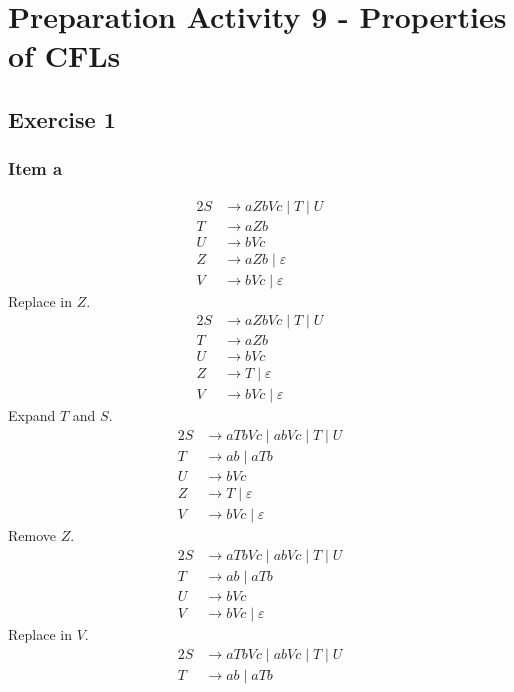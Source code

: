 \setcounter{section}{8}
\section{Preparation Activity 9 - Properties of CFLs}
{
\renewcommand{\thesubsubsection}{\thesubsection\alph{subsubsection}}
\subsection{Exercise 1}
\subsubsection{Item a}
\begin{alignat*}{2}
	S &\rightarrow aZbVc\mid T\mid U\\
	T &\rightarrow aZb\\
	U &\rightarrow bVc\\
	Z &\rightarrow aZb\mid \varepsilon \\
	V &\rightarrow bVc\mid \varepsilon
\end{alignat*}
Replace in $Z$.
\begin{alignat*}{2}
	S &\rightarrow aZbVc\mid T\mid U\\
	T &\rightarrow aZb\\
	U &\rightarrow bVc\\
	Z &\rightarrow T\mid \varepsilon \\
	V &\rightarrow bVc\mid \varepsilon
\end{alignat*}
Expand $T$ and $S$.
\begin{alignat*}{2}
	S &\rightarrow aTbVc\mid abVc\mid T\mid U\\
	T &\rightarrow ab\mid aTb\\
	U &\rightarrow bVc\\
	Z &\rightarrow T\mid \varepsilon \\
	V &\rightarrow bVc\mid \varepsilon
\end{alignat*}
Remove $Z$.
\begin{alignat*}{2}
	S &\rightarrow aTbVc\mid abVc\mid T\mid U\\
	T &\rightarrow ab\mid aTb\\
	U &\rightarrow bVc\\
	V &\rightarrow bVc\mid \varepsilon
\end{alignat*}
Replace in $V$.
\begin{alignat*}{2}
	S &\rightarrow aTbVc\mid abVc\mid T\mid U\\
	T &\rightarrow ab\mid aTb\\

\end{alignat*}}
